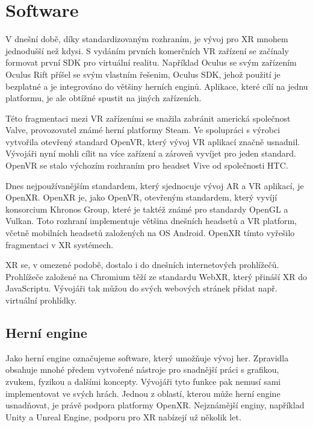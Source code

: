 \chapter{Software}

V dnešní době, díky standardizovaným rozhraním, je vývoj pro XR mnohem jednodušší než kdysi. S vydáním prvních komerčních VR zařízení se začínaly formovat první \gls{SDK} pro virtuální realitu. Například Oculus se svým zařízením Oculus Rift příšel se svým vlastním řešenim, Oculus SDK, jehož použití je bezplatné a je integrováno do většiny herních enginů. Aplikace, které cílí na jednu platformu, je ale obtížné spustit na jiných zařízeních. \cite{enwiki:1193283032}

Této fragmentaci mezi VR zařízeními se snažila zabránit americká společnost Valve, provozovatel známé herní platformy Steam. Ve spolupráci s výrobci vytvořila otevřený standard OpenVR, který vývoj VR aplikací značně usnadnil. Vývojáři nyní mohli cílit na více zařízení a zároveň vyvíjet pro jeden standard. OpenVR se stalo výchozím rozhraním pro headset Vive od společnosti HTC. \cite{enwiki:1192992480}

Dnes nejpoužívanějším standardem, který sjednocuje vývoj AR a VR aplikací, je OpenXR. OpenXR je, jako OpenVR, otevřeným standardem, který vyvíjí konsorcium Khronos Group, které je taktéž známé pro standardy OpenGL a Vulkan. Toto rozhraní implementuje většina dnešních headsetů a VR platform, včetně mobilních headsetů založených na OS Android. OpenXR tímto vyřešilo fragmentaci v XR systémech. \cite{enwiki:1186405367}

XR se, v omezené podobě, dostalo i do dnešních internetových prohlížečů. Prohlížeče založené na Chromium těží ze standardu WebXR, který přináší XR do JavaScriptu. Vývojáři tak můžou do svých webových stránek přidat např. virtuální prohlídky. \cite{webxr_mdn}

\section{Herní engine}

Jako herní engine označujeme software, který umožňuje vývoj her. Zpravidla obsahuje mnohé předem vytvořené nástroje pro snadnější práci s grafikou, zvukem, fyzikou a dalšími koncepty. Vývojáři tyto funkce pak nemusí sami implementovat ve svých hrách. Jednou z oblastí, kterou může herní engine usnadňovat, je právě podpora platformy OpenXR. Nejznámější enginy, například Unity a Unreal Engine, podporu pro XR nabízejí už několik let. \cite{enwiki:1186405367}

